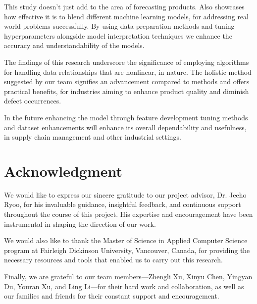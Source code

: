 \documentclass[conference]{IEEEtran}
\begin{document}
This study doesn't just add to the area of forecasting products. Also showcases how effective it is to blend different machine learning models, for addressing real world problems successfully. By using data preparation methods and tuning hyperparameters alongside model interpretation techniques we enhance the accuracy and understandability of the models.

The findings of this research underscore the significance of employing algorithms for handling data relationships that are nonlinear, in nature. The holistic method suggested by our team signifies an advancement compared to methods and offers practical benefits, for industries aiming to enhance product quality and diminish defect occurrences.

In the future enhancing the model through feature development tuning methods and dataset enhancements will enhance its overall dependability and usefulness, in supply chain management and other industrial settings.

\section*{Acknowledgment}
We would like to express our sincere gratitude to our project advisor, Dr. Jeeho Ryoo, for his invaluable guidance, insightful feedback, and continuous support throughout the course of this project. His expertise and encouragement have been instrumental in shaping the direction of our work.

We would also like to thank the Master of Science in Applied Computer Science program at Fairleigh Dickinson University, Vancouver, Canada, for providing the necessary resources and tools that enabled us to carry out this research.

Finally, we are grateful to our team members—Zhengli Xu, Xinyu Chen, Yingyan Du, Youran Xu, and Ling Li—for their hard work and collaboration, as well as our families and friends for their constant support and encouragement.


%


\end{document}
